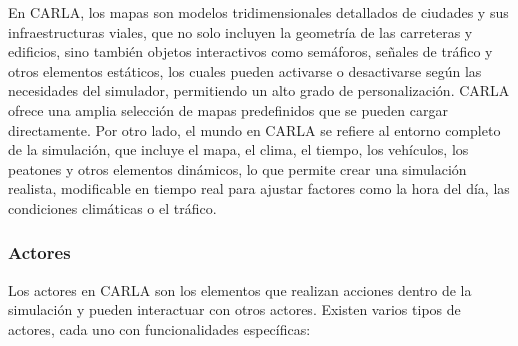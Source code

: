 En CARLA, los mapas son modelos tridimensionales detallados de ciudades y sus infraestructuras viales, que no solo incluyen la geometría de las carreteras y edificios, sino también objetos interactivos como semáforos, señales de tráfico y otros elementos estáticos, los cuales pueden activarse o desactivarse según las necesidades del simulador, permitiendo un alto grado de personalización. CARLA ofrece una amplia selección de mapas predefinidos que se pueden cargar directamente. Por otro lado, el mundo en CARLA se refiere al entorno completo de la simulación, que incluye el mapa, el clima, el tiempo, los vehículos, los peatones y otros elementos dinámicos, lo que permite crear una simulación realista, modificable en tiempo real para ajustar factores como la hora del día, las condiciones climáticas o el tráfico.

\subsubsection{Actores}

Los actores en CARLA son los elementos que realizan acciones dentro de la simulación y pueden interactuar con otros actores. Existen varios tipos de actores, cada uno con funcionalidades específicas:

